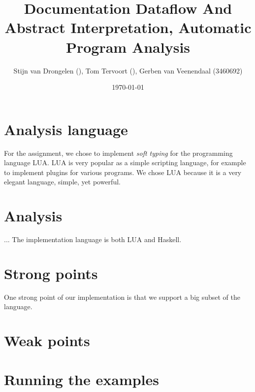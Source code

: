 \documentclass[a4paper]{article}
\title{Documentation Dataflow And Abstract Interpretation, Automatic Program Analysis}
\author{Stijn van Drongelen (), Tom Tervoort (), Gerben van Veenendaal (3460692)}
\date{\today}
\begin{document}
\maketitle

\section*{Analysis language}

For the assignment, we chose to implement \textit{soft typing} for the programming language LUA. LUA is very popular as a simple scripting language, for example to implement plugins for various programs. We chose LUA because it is a very elegant language, simple, yet powerful.

\section*{Analysis}

...
The implementation language is both LUA and Haskell.


\section*{Strong points}

One strong point of our implementation is that we support a big subset of the language.


\section*{Weak points}

\section*{Running the examples}
\end{document}
